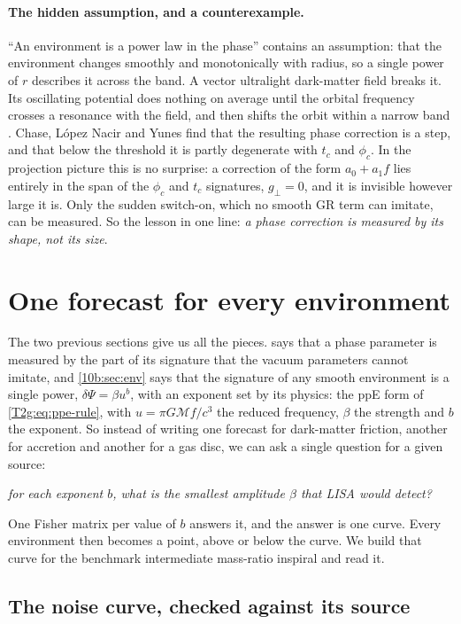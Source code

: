 \paragraph{The hidden assumption, and a counterexample.} ``An environment is a power law in the phase'' contains an
assumption: that the environment changes smoothly and monotonically with radius, so a single power of $r$ describes
it across the band. A vector ultralight dark-matter field breaks it. Its oscillating potential does nothing on average
until the orbital frequency crosses a resonance with the field, and then shifts the orbit within a narrow band
\cite{Chase2025}. Chase, L\'opez Nacir and Yunes find that the resulting phase correction is a step, and that below the
threshold it is partly degenerate with $t_c$ and $\phi_c$. In the projection picture this is no surprise: a correction
of the form $a_0+a_1f$ lies entirely in the span of the $\phi_c$ and $t_c$ signatures, $g_\perp=0$, and it is invisible
however large it is. Only the sudden switch-on, which no smooth GR term can imitate, can be measured. So the lesson in
one line: \emph{a phase correction is measured by its shape, not its size}.
\section{One forecast for every environment}
\label{10b:sec:forecast}

The two previous sections give us all the pieces.  says that a phase parameter is measured by
the part of its signature that the vacuum parameters cannot imitate, and \cref{10b:sec:env} says that the signature of
any smooth environment is a single power, $\delta\Psi=\beta u^b$, with an exponent set by its physics: the ppE form of
\cref{T2g:eq:ppe-rule}, with $u=\pi G\mathcal Mf/c^3$ the reduced frequency, $\beta$ the strength and $b$ the exponent. So instead of
writing one forecast for dark-matter friction, another for accretion and another for a gas disc, we can ask a single
question for a given source:
\begin{center}
\emph{for each exponent $b$, what is the smallest amplitude $\beta$ that LISA would detect?}
\end{center}
One Fisher matrix per value of $b$ answers it, and the answer is one curve. Every environment then becomes a point,
above or below the curve. We build that curve for the benchmark intermediate mass-ratio inspiral and read it.

\subsection{The noise curve, checked against its source}
\label{10b:sec:robson}

